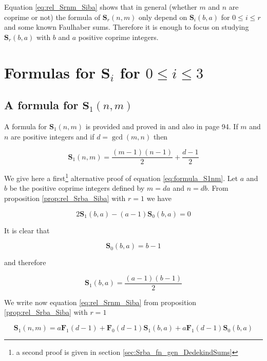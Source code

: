 \documentclass{article}%
\newcommand{\SUMS}[3]{\mathbf{S}_{#1}\left(#2,#3\right)}
\newcommand{\SUMF}[2]{\mathbf{F}_{#1}\left(#2\right)}
\begin{document}
Equation \ref{eq:rel_Srnm_Siba} shows that in general (whether $m$ and $n$ are coprime or not) the formula of $\SUMS{r}{n}{m}$ only depend on $\SUMS{i}{b}{a}$ for $0\leq i \leq r$ and some known Faulhaber sums. Therefore it is enough to focus on studying $\SUMS{r}{b}{a}$ with $b$ and $a$ positive coprime integers.

\section{Formulas for $\mathbf{S}_i$ for $0\leq i\leq 3$}

\subsection{A formula for $\SUMS{1}{n}{m}$}\label{sec:S1nm}

A formula for $\SUMS{1}{n}{m}$ is provided and proved in \cite{polezzi1997Geometrical} and also in \cite{graham1994concrete} page 94.
If $m$ and $n$ are positive integers and if $d=\gcd(m,n)$ then

\begin{equation}
\SUMS{1}{n}{m} = \frac{(m-1)(n-1)}{2}+\frac{d-1}{2} 
\label{eq:formula_S1nm}
\end{equation}

We give here a first\footnote{a second proof is given in section \ref{sec:Srba_fn_gen_DedekindSums}} alternative proof of equation \ref{eq:formula_S1nm}. Let $a$ and $b$ be the positive coprime integers defined by $m=da$ and $n=db$. From proposition \ref{prop:rel_Srba_Siba} with $r=1$ we have

\begin{equation*}
2\SUMS{1}{b}{a} - (a-1)\SUMS{0}{b}{a} = 0
\end{equation*}

It is clear that

\begin{equation}
\SUMS{0}{b}{a}=b-1
\label{eq:formula_S0ba}
\end{equation}

and therefore

\begin{equation}
\SUMS{1}{b}{a} = \frac{(a-1)(b-1)}{2}
\label{eq:formula_S1ba}
\end{equation}

We write now equation \ref{eq:rel_Srnm_Siba} from proposition \ref{prop:rel_Srba_Siba} with $r=1$

\begin{equation*}
\SUMS{1}{n}{m} = a\SUMF{1}{d-1}+\SUMF{0}{d-1}\SUMS{1}{b}{a}+a\SUMF{1}{d-1}\SUMS{0}{b}{a}
\end{equation*}
\end{document}
